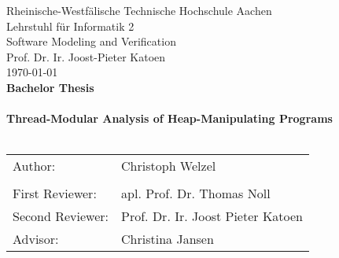 \begin{titlepage}
\begin{center}
{\Large Rheinische-Westfälische Technische Hochschule Aachen\\
Lehrstuhl für Informatik 2\\
Software Modeling and Verification\\
Prof. Dr. Ir. Joost-Pieter Katoen}\\[1cm]
\today\\[1.5cm]
{\Large \textbf{Bachelor Thesis}}\\[1.5cm]
\HRule\\[0.8cm]
{\LARGE \textbf{Thread-Modular Analysis of Heap-Manipulating Programs}\\[0.2cm]}
\HRule\\[2cm]
\resizebox{!}{5.5cm}{}
\end{center}
\vfill
\begin{tabular}{p{4cm}l}
Author: & Christoph Welzel\\
&\\
First Reviewer: & apl. Prof. Dr. Thomas Noll\\
Second Reviewer: & Prof. Dr. Ir. Joost Pieter Katoen\\
Advisor: & Christina Jansen\\
\end{tabular}

\end{titlepage}
